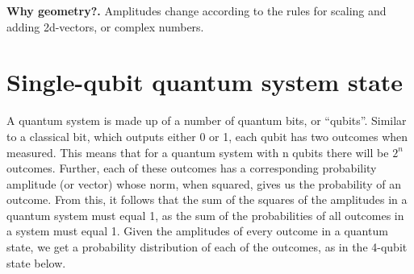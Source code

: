 \documentclass[11pt, letterpaper]{article}
\def\onecol{true}
\renewcommand{\myboldhead}[1]{\vspace{.1in}\hspace{-.14in}\textbf{#1.}}
\begin{document}
{\myboldhead{Why geometry?}
Amplitudes change according to the rules for scaling and adding 2d-vectors, or complex numbers.


\section{Single-qubit quantum system state}
\label{sec:state}

A quantum system is made up of a number of quantum bits, or “qubits”. Similar to a classical bit, which outputs either 0 or 1, each qubit has two outcomes when measured. This means that for a quantum system with n qubits there will be $2^n$ outcomes. Further, each of these outcomes has a corresponding probability amplitude (or vector) whose norm, when squared, gives us the probability of an outcome. From this, it follows that the sum of the squares of the amplitudes in a quantum system must equal 1, as the sum of the probabilities of all outcomes in a system must equal 1. Given the amplitudes of every outcome in a quantum state, we get a probability distribution of each of the outcomes, as in the 4-qubit state below.

\begin{figure}[hbt]
	\begin{centering}
		\ifthenelse{\equal{\onecol}{true}}{ \def\xyz{.3}}{ \def\xyz{.36}}
		\def\zyx{.005}
		{\setlength\fboxsep{0pt}}\hspace{\zyx\columnwidth}
		

\end{centering}
\end{figure}}
\end{document}
